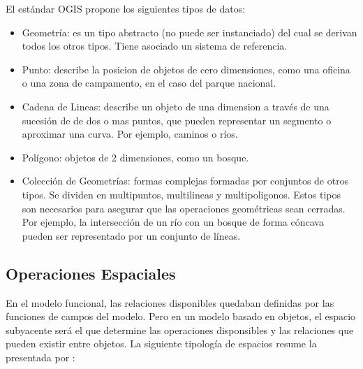 El estándar OGIS propone los siguientes tipos de datos:
\begin{itemize}
    \item Geometría: es un tipo abstracto (no puede ser instanciado) del cual se derivan todos los otros tipos.
    Tiene asociado un sistema de referencia.
    \item Punto: describe la posicion de objetos de cero dimensiones,
    como una oficina o una zona de campamento, en el caso del parque nacional.
    \item Cadena de Lineas: describe un objeto de una dimension a través de una sucesión de de dos o mas puntos,
    que pueden representar un segmento o aproximar una curva. Por ejemplo, caminos o ríos.
    \item Polígono: objetos de 2 dimensiones, como un bosque.
    \item Colección de Geometrías: formas complejas formadas por conjuntos de otros tipos.
    Se dividen en multipuntos, multilineas y multipoligonos.
    Estos tipos son necesarios para asegurar que las operaciones geométricas sean cerradas.
    Por ejemplo, la intersección de un río con un bosque de forma cóncava pueden ser representado por un conjunto de líneas.
\end{itemize}

\subsection{Operaciones Espaciales}

En el modelo funcional, las relaciones disponibles quedaban definidas por las funciones de campos del modelo.
Pero en un modelo basado en objetos, el espacio subyacente será el que determine las operaciones disponsibles
y las relaciones que pueden existir entre objetos. La siguiente tipología de espacios resume la presentada por \cite{spatial:book}:

